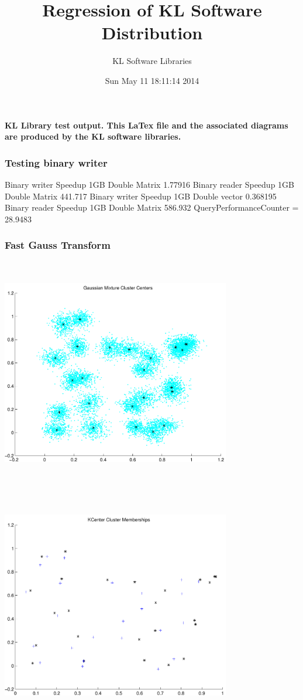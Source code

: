 \documentclass[9pt]{article}
\theoremstyle{plain}
\theoremstyle{definition}
\theoremstyle{remark}
\numberwithin{equation}{section}
\begin{document}
\title{Regression of KL Software Distribution   }
\author{KL Software Libraries}
\date{Sun May 11 18:11:14 2014
}
\maketitle
\textbf{ KL Library test output.  This LaTex file and the associated diagrams are produced by the KL software libraries.}
\subsubsection{Testing binary writer}
Binary writer Speedup 1GB Double Matrix 1.77916
Binary reader Speedup 1GB Double Matrix 441.717
Binary writer Speedup 1GB Double vector 0.368195
Binary reader Speedup 1GB Double Matrix 586.932
QueryPerformanceCounter  =  28.9483
\subsubsection{Fast Gauss Transform}
\includegraphics[width=10.0cm,height=10.0cm]{GaussianMixture_ClusterCenters25_Centers.pdf}

\includegraphics[width=10.0cm,height=10.0cm]{KCenterClusterMemberships_25_Centers.pdf}
\end{document}
